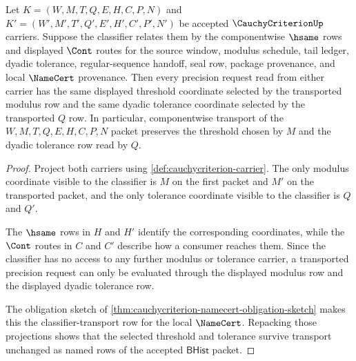 \begin{theorem}
\label{thm:cauchycriterion-modulus-threshold-stability}
Let $K=(W,M,T,Q,E,H,C,P,N)$ and $K'=(W',M',T',Q',E',H',C',P',N')$ be accepted $\CauchyCriterionUp$ carriers. Suppose the classifier relates them by the componentwise $\hsame$ rows and displayed $\Cont$ routes for the source window, modulus schedule, tail ledger, dyadic tolerance, regular-sequence handoff, seal row, package provenance, and local $\NameCert$ provenance. Then every precision request read from either carrier has the same displayed threshold coordinate selected by the transported modulus row and the same dyadic tolerance coordinate selected by the transported $Q$ row. In particular, componentwise transport of the $W,M,T,Q,E,H,C,P,N$ packet preserves the threshold chosen by $M$ and the dyadic tolerance row read by $Q$.
\end{theorem}
\begin{proof}
Project both carriers using \autoref{def:cauchycriterion-carrier}. The only modulus coordinate visible to the classifier is $M$ on the first packet and $M'$ on the transported packet, and the only tolerance coordinate visible to the classifier is $Q$ and $Q'$.

The $\hsame$ rows in $H$ and $H'$ identify the corresponding coordinates, while the $\Cont$ routes in $C$ and $C'$ describe how a consumer reaches them. Since the classifier has no access to any further modulus or tolerance carrier, a transported precision request can only be evaluated through the displayed modulus row and the displayed dyadic tolerance row.

The obligation sketch of \autoref{thm:cauchycriterion-namecert-obligation-sketch} makes this the classifier-transport row for the local $\NameCert$. Repacking those projections shows that the selected threshold and tolerance survive transport unchanged as named rows of the accepted $\mathsf{BHist}$ packet.
\end{proof}

